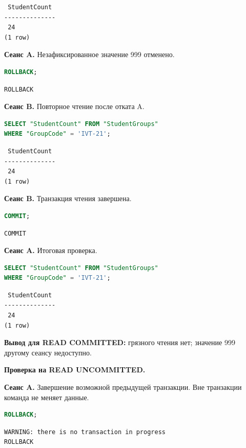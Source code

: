 \documentclass[12pt,a4paper]{article}
\begin{document}
\begin{lstlisting}
 StudentCount
--------------
 24
(1 row)
\end{lstlisting}

\textbf{Сеанс A.} Незафиксированное значение 999 отменено.
\begin{lstlisting}[language=SQL]
ROLLBACK;
\end{lstlisting}

\begin{lstlisting}
ROLLBACK
\end{lstlisting}

\textbf{Сеанс B.} Повторное чтение после отката A.
\begin{lstlisting}[language=SQL]
SELECT "StudentCount" FROM "StudentGroups"
WHERE "GroupCode" = 'IVT-21';
\end{lstlisting}

\begin{lstlisting}
 StudentCount
--------------
 24
(1 row)
\end{lstlisting}

\textbf{Сеанс B.} Транзакция чтения завершена.
\begin{lstlisting}[language=SQL]
COMMIT;
\end{lstlisting}

\begin{lstlisting}
COMMIT
\end{lstlisting}

\textbf{Сеанс A.} Итоговая проверка.
\begin{lstlisting}[language=SQL]
SELECT "StudentCount" FROM "StudentGroups"
WHERE "GroupCode" = 'IVT-21';
\end{lstlisting}

\begin{lstlisting}
 StudentCount
--------------
 24
(1 row)
\end{lstlisting}

\textbf{Вывод для READ COMMITTED:} грязного чтения нет; значение 999 другому сеансу недоступно.

\textbf{Проверка на READ UNCOMMITTED.}

\textbf{Сеанс A.} Завершение возможной предыдущей транзакции. Вне транзакции команда не меняет данные.
\begin{lstlisting}[language=SQL]
ROLLBACK;
\end{lstlisting}

\begin{lstlisting}
WARNING: there is no transaction in progress
ROLLBACK
\end{lstlisting}
\end{document}
